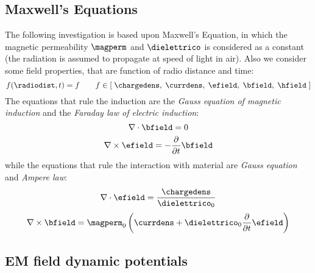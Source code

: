 \subsection{Maxwell's Equations}
The following investigation is based upon Maxwell's Equation, in which the magnetic permeability $\magperm$ and $\dielettrico$ is considered as a constant (the radiation is assumed to propagate at speed of light in air). Also we consider some field properties, that are function of radio distance and time:
\[
f(\radiodist,t) = f \qquad f \in \left[\; \chargedens,\; \currdens,\; \efield,\; \bfield,\; \hfield \; \right]
\]
The equations that rule the induction are the \emph{Gauss equation of magnetic induction} and the \emph{Faraday law of electric induction}:
\begin{equation}
\nabla\cdot\bfield = 0
\label{eq:gauss1}
\end{equation}
\begin{equation}
\nabla\times\efield = -\partialt \bfield
\label{eq:faraday}
\end{equation}
while the equations that rule the interaction with material are \emph{Gauss equation} and \emph{Ampere law}:
\begin{equation}
\nabla\cdot\efield = \dfrac{\chargedens}{{\dielettrico}_0}
\label{eq:gauss2}
\end{equation}
\begin{equation}
\nabla\times\bfield = {\magperm}_0 \left( \currdens + {\dielettrico}_0 \partialt \efield \right)
\label{eq:ampere}
\end{equation}

\subsection{EM field dynamic potentials}


